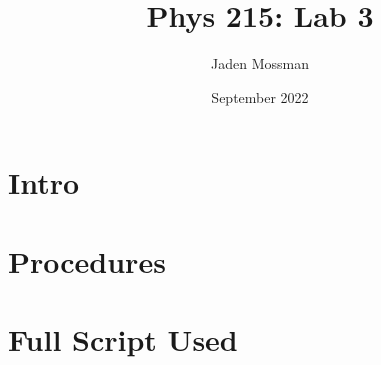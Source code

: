 \documentclass{article}
\title{Phys 215: Lab 3}
\author{Jaden Mossman}
\date{September 2022}
\begin{document}
    \maketitle
    \tableofcontents

    \newpage
    \section{Intro}

    \section{Procedures}
    
    \newpage
    \section{Full Script Used}
        
\end{document}
